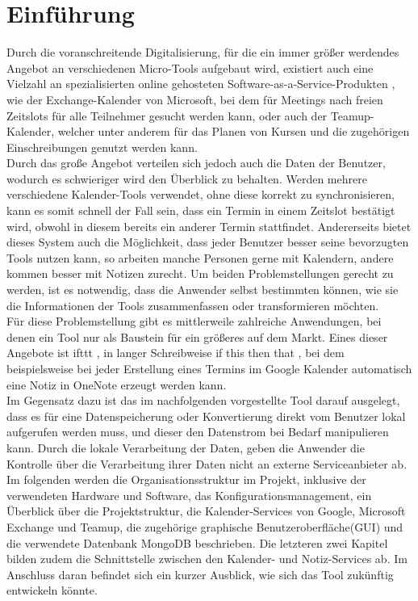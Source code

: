 \section{Einführung}
Durch die voranschreitende Digitalisierung, für die ein immer größer werdendes Angebot an verschiedenen Micro-Tools aufgebaut wird, existiert auch eine Vielzahl an spezialisierten online gehosteten Software-as-a-Service-Produkten \cite{Abolhassan.2016}, wie der Exchange-Kalender von Microsoft, bei dem für Meetings nach freien Zeitslots für alle Teilnehmer gesucht werden kann, oder auch der Teamup-Kalender, welcher unter anderem für das Planen von Kursen und die zugehörigen Einschreibungen genutzt werden kann. \\
Durch das große Angebot verteilen sich jedoch auch die Daten der Benutzer, wodurch es schwieriger wird den Überblick zu behalten. Werden mehrere verschiedene Kalender-Tools verwendet, ohne diese korrekt zu synchronisieren, kann es somit schnell der Fall sein, dass ein Termin in einem Zeitslot bestätigt wird, obwohl in diesem bereits ein anderer Termin stattfindet. Andererseits bietet dieses System auch die Möglichkeit, dass jeder Benutzer besser seine bevorzugten Tools nutzen kann, so arbeiten manche Personen gerne mit Kalendern, andere kommen besser mit Notizen zurecht.
Um beiden Problemstellungen gerecht zu werden, ist es notwendig, dass die Anwender selbst bestimmten können, wie sie die Informationen der Tools zusammenfassen oder transformieren möchten. \\
Für diese Problemstellung gibt es mittlerweile zahlreiche Anwendungen, bei denen ein Tool nur als Baustein für ein größeres auf dem Markt. Eines dieser Angebote ist \glqq ifttt \grqq, in langer Schreibweise \glqq if this then that \grqq, bei dem beispielsweise bei jeder Erstellung eines Termins im Google Kalender automatisch eine Notiz in OneNote erzeugt werden kann. \\
Im Gegensatz dazu ist das im nachfolgenden vorgestellte Tool darauf ausgelegt, dass es für eine Datenspeicherung oder Konvertierung direkt vom Benutzer lokal aufgerufen werden muss, und dieser den Datenstrom bei Bedarf manipulieren kann. Durch die lokale Verarbeitung der Daten, geben die Anwender die Kontrolle über die Verarbeitung ihrer Daten nicht an externe Serviceanbieter ab.\\
Im folgenden werden die Organisationsstruktur im Projekt, inklusive der verwendeten Hardware und Software, das Konfigurationsmanagement, ein Überblick über die Projektstruktur, die Kalender-Services von Google, Microsoft Exchange und Teamup, die zugehörige graphische Benutzeroberfläche(GUI) und die verwendete Datenbank MongoDB beschrieben. Die letzteren zwei Kapitel bilden zudem die Schnittstelle zwischen den Kalender- und Notiz-Services ab. Im Anschluss daran befindet sich ein kurzer Ausblick, wie sich das Tool zukünftig entwickeln könnte.